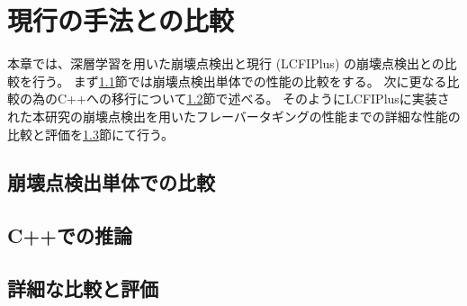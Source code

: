 
\chapter{現行の手法との比較} \label{chap:Comparison}

本章では、深層学習を用いた崩壊点検出と現行 (LCFIPlus) の崩壊点検出との比較を行う。
まず\ref{Com:ComparisonwithVF}節では崩壊点検出単体での性能の比較をする。
次に更なる比較の為のC++への移行について\ref{Com:InferencewithCplusplus}節で述べる。
そのようにLCFIPlusに実装された本研究の崩壊点検出を用いたフレーバータギングの性能までの詳細な性能の比較と評価を\ref{Com:DetailedComparisonandEvaluation}節にて行う。

\section{崩壊点検出単体での比較} \label{Com:ComparisonwithVF}


\section{C++での推論} \label{Com:InferencewithCplusplus}


\section{詳細な比較と評価} \label{Com:DetailedComparisonandEvaluation}